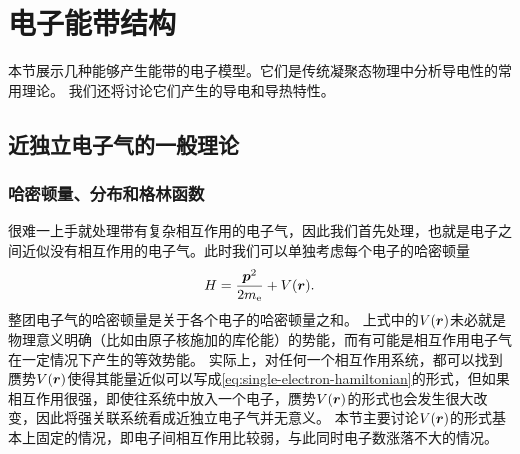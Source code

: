 \section{电子能带结构}

本节展示几种能够产生能带的电子模型。它们是传统凝聚态物理中分析导电性的常用理论。
我们还将讨论它们产生的导电和导热特性。

\subsection{近独立电子气的一般理论}

\subsubsection{哈密顿量、分布和格林函数}

很难一上手就处理带有复杂相互作用的电子气，因此我们首先处理，也就是电子之间近似没有相互作用的电子气。此时我们可以单独考虑每个电子的哈密顿量
\begin{equation}
    {H} = \frac{{\vb*{p}}^2}{2m_\text{e}} + V(\vb*{r}).
    \label{eq:single-electron-hamiltonian}
\end{equation}
整团电子气的哈密顿量是关于各个电子的哈密顿量之和。
上式中的$V(\vb*{r})$未必就是物理意义明确（比如由原子核施加的库伦能）的势能，而有可能是相互作用电子气在一定情况下产生的等效势能。
实际上，对任何一个相互作用系统，都可以找到赝势$V(\vb*{r})$使得其能量近似可以写成\eqref{eq:single-electron-hamiltonian}的形式，但如果相互作用很强，即使往系统中放入一个电子，赝势$V(\vb*{r})$的形式也会发生很大改变，因此将强关联系统看成近独立电子气并无意义。
本节主要讨论$V(\vb*{r})$的形式基本上固定的情况，即电子间相互作用比较弱，与此同时电子数涨落不大的情况。


